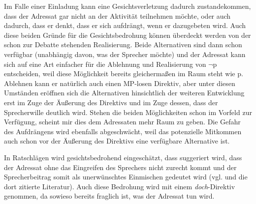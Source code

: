{Im Falle einer Einladung  kann eine Gesichtsverletzung dadurch zustandekommen, dass der Adressat gar nicht an der Aktivität teilnehmen möchte, oder auch dadurch, dass er denkt, dass er sich aufdrängt, wenn er dazugebeten wird. Auch diese beiden Gründe für die Gesichtsbedrohung können überdeckt werden von der schon zur Debatte stehenden Realisierung. Beide Alternativen sind dann schon verfügbar (unabhängig davon, was der Sprecher möchte) und der Adressat kann sich auf eine Art einfacher für die Ablehnung und Realisierung von $\neg$p entscheiden, weil diese Möglichkeit bereits gleichermaßen im Raum steht wie p. Ablehnen kann er natürlich auch einen MP-losen Direktiv, aber unter diesen Umständen eröffnen sich die Alternativen hinsichtlich der weiteren Entwicklung erst im Zuge der Äußerung des Direktivs und im Zuge dessen, dass der Sprecherwille deutlich wird. Stehen die beiden Möglichkeiten schon im Vorfeld zur Verfügung, scheint mir dies dem Adressaten mehr Raum zu geben. Die Gefahr des Aufdrängens wird ebenfalls abgeschwächt, weil das potenzielle Mitkommen auch schon vor der Äußerung des Direktivs eine verfügbare Alternative ist.

In Ratschlägen  wird gesichtsbedrohend  eingeschätzt, dass suggeriert wird, dass der Adressat ohne das Eingreifen des Sprechers nicht zurecht kommt und der Sprecherbeitrag somit als unerwünschtes Einmischen gedeutet wird (vgl. \citealt[114]{Frank2011} und die dort zitierte Literatur). Auch diese Bedrohung wird mit einem \textit{doch}-Direktiv genommen, da sowieso bereits fraglich ist, was der Adressat tun wird.

}
